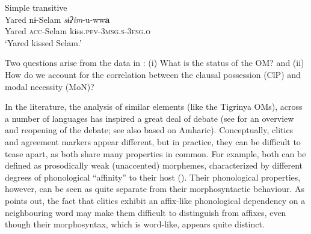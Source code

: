 \documentclass[output=paper]{langscibook}
\begin{document}
\ea\label{ex:Gebregziabher:trans} Simple transitive \\
\gll Yared nɨ-Selam \textit{sɨʔim}-u-ww\textbf{a} \\
Yared {\scshape acc-}Selam kiss.{\scshape pfv-3msg.s-3fsg.o}\\
\glt `Yared kissed Selam.'
\z\largerpage

\noindent Two questions arise from the data in : (i) What is the status of the OM? and (ii) How do we account for the correlation between the clausal possession (ClP) and modal necessity (MoN)?

\begin{sloppypar}
In the literature, the analysis of similar elements (like the Tigrinya OMs), across a number of languages has inspired a great deal of debate (see \citealt{nevins11a}  for an overview and reopening of the debate; see also \citealt{kramer14} based on Amharic). Conceptually, clitics and agreement markers appear different, but in practice, they can be difficult to tease apart, as both share many properties in common. For example, both can be defined as prosodically weak (unaccented) morphemes, characterized by different degrees of phonological ``affinity'' to their host (\citealt{stump01}). Their phonological properties, however, can be seen as quite separate from their morphosyntactic behaviour. As \citet[16]{stump01} points out, the fact that clitics exhibit an affix-like phonological dependency on a neighbouring word may make them difficult to distinguish from affixes, even though their morphosyntax, which is word-like, appears quite distinct.


\end{sloppypar}
\end{document}
